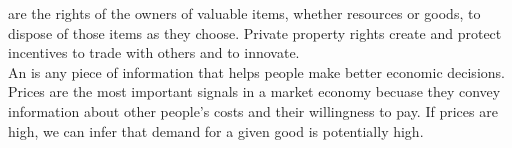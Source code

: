 \documentclass{article}
\begin{document}
 are the rights of the owners of valuable items, whether resources or goods, to dispose of those items as they choose. Private property rights create and protect incentives to trade with others and to innovate. \\ 

An  is any piece of information that helps people make better economic decisions. Prices are the most important signals in a market economy becuase they convey information about other people's costs and their willingness to pay. If prices are high, we can infer that demand for a given good is potentially high. 
\end{document}
